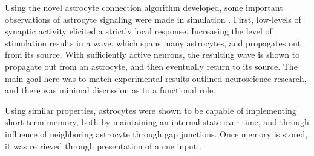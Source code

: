     Using the novel astrocyte connection algorithm developed, some important
    observations of astrocyte signaling were made in simulation
    \parencite{postnov_2009}. First, low-levels of synaptic activity elicited a
    strictly local response. Increasing the level of stimulation results in a
    \ca wave, which spans many astrocytes, and propagates out from its
    source. With sufficiently active neurons, the resulting \ca wave is shown to
    propagate out from an astrocyte, and then eventually return to its
    source. The main goal here was to match experimental results outlined
    neuroscience research, and there was minimal discussion as to a functional
    role.

    Using similar properties, astrocytes were shown to be capable of
    implementing short-term memory, both by maintaining an internal state over
    time, and through influence of neighboring astrocyte through gap
    junctions. Once memory is stored, it was retrieved through presentation of
    a cue input \parencite{gordleeva_2021}.

    
    
    
